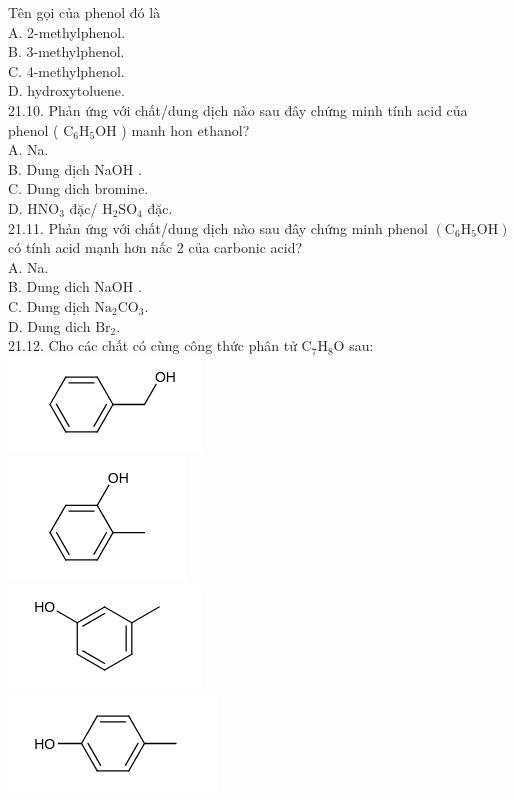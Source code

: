 \documentclass[10pt]{article}
\begin{document}
Tên gọi của phenol đó là\\
A. 2-methylphenol.\\
B. 3-methylphenol.\\
C. 4-methylphenol.\\
D. hydroxytoluene.\\
21.10. Phản ứng với chất/dung dịch nào sau đây chứng minh tính acid của phenol ( $\mathrm{C}_{6} \mathrm{H}_{5} \mathrm{OH}$ ) manh hon ethanol?\\
A. Na.\\
B. Dung dịch NaOH .\\
C. Dung dich bromine.\\
D. $\mathrm{HNO}_{3}$ đặc/ $\mathrm{H}_{2} \mathrm{SO}_{4}$ đặc.\\
21.11. Phản ứng với chất/dung dịch nào sau đây chứng minh phenol $\left(\mathrm{C}_{6} \mathrm{H}_{5} \mathrm{OH}\right)$ có tính acid mạnh hơn nấc 2 của carbonic acid?\\
A. Na.\\
B. Dung dich NaOH .\\
C. Dung dịch $\mathrm{Na}_{2} \mathrm{CO}_{3}$.\\
D. Dung dich $\mathrm{Br}_{2}$.\\
21.12. Cho các chất có cùng công thức phân tử $\mathrm{C}_{7} \mathrm{H}_{8} \mathrm{O}$ sau:\\
\includegraphics{smile-ae487b1401f156292ad07e6087b95069188bc895}\\
\includegraphics{smile-6b4ded2887baeb6fa657fcbea88e2be9bae3e764}\\
\includegraphics{smile-8dd3490ec8e20c460ab461a4f6ec6950b9ef5394}\\
\includegraphics{smile-03295b8eae25286a2b11cc9e8eb36935757c277d}
\end{document}
